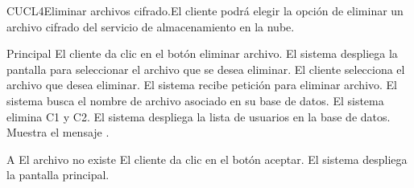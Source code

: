 
\begin{UseCase}{CUCL4}{Eliminar archivos cifrado.}{El cliente podrá elegir la opción de eliminar un archivo cifrado del servicio de almacenamiento en la nube.}

\end{UseCase}


\begin{UCtrayectoria}{Principal}
	\UCpaso [\UCactor] El cliente da clic en el botón eliminar archivo.
	\UCpaso  El sistema despliega la pantalla para seleccionar el archivo que se desea eliminar.
	\UCpaso [\UCactor] El cliente selecciona el archivo que desea eliminar.
	\UCpaso  El sistema recibe petición para eliminar archivo.
	\UCpaso  El sistema busca el nombre de archivo asociado en su base de datos.
	\UCpaso  El sistema elimina C1 y C2.
	\UCpaso  El sistema despliega la lista de usuarios en la base de datos.
	\UCpaso Muestra el mensaje .\end{UCtrayectoria}

\begin{UCtrayectoriaA}{A}
	{El archivo no existe}
	\UCpaso [\UCactor] El cliente da clic en el botón aceptar.
	\UCpaso El sistema despliega la pantalla principal.
\end{UCtrayectoriaA}

